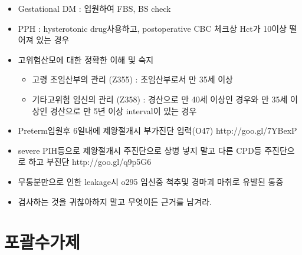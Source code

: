 \begin{tcolorbox}[frogbox,title=기타진단 기준tip]
\begin{itemize}\tightlist
\item Gestational DM : 입원하여 FBS, BS check
\item PPH : hysterotonic drug사용하고, postoperative CBC 체크상 Hct가 10이상 떨어져 있는 경우
\item 고위험산모에 대한 정확한 이해 및 숙지
	\begin{itemize}\tightlist
	\item 고령 초임산부의 관리 (Z355) : 초임산부로서 만 35세 이상
	\item 기타고위험 임신의 관리 (Z358) : 경산으로 만 40세 이상인 경우와 만 35세 이상인 경산으로 만 5년 이상 interval이 있는 경우
	\end{itemize}
\item Preterm입원후 6일내에 제왕절개시 부가진단 입력(O47) http://goo.gl/7YBexP
\item severe PIH등으로 제왕절개시 주진단으로 상병 넣지 말고 다른 CPD등 주진단으로 하고 부진단 http://goo.gl/q9p5G6
\item 무통분만으로 인한 leakage시 o295 임신중 척추및 경마괴 마취로 유발된 통증
\item 검사하는 것을 귀찮아하지 말고 무엇이든 근거를 남겨라. 
\end{itemize}
\end{tcolorbox}

\clearpage
\section{포괄수가제}

